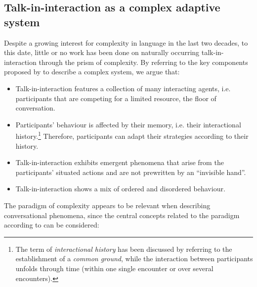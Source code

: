 \documentclass[output=paper]{langscibook}
\begin{document}
\subsection{Talk-in-interaction as a complex adaptive system}

Despite a growing interest for complexity in language in the last two decades, to this date, little or no work has been done on naturally occurring talk-in-in\-ter\-ac\-tion through the prism of complexity. By referring to the key components proposed by \citet{Johnson2007} to describe a complex system, we argue that:

\begin{itemize}
\item Talk-in-interaction features a collection of many interacting agents, i.e. participants that are competing for a limited resource, the floor of conversation.\largerpage

\item Participants' behaviour is affected by their memory, i.e. their interactional history.\footnote{The term of \textit{interactional history} has been discussed by \citet{Deppermann2018} referring to the establishment of a \textit{common ground}, while the interaction between participants unfolds through time (within one single encounter or over several encounters).} Therefore, participants can adapt their strategies according to their history. 

\item Talk-in-interaction exhibits emergent phenomena that arise from the participants' situated actions and are not prewritten by an “invisible hand”.

\item Talk-in-interaction shows a mix of ordered and disordered behaviour.
\end{itemize}

The paradigm of complexity appears to be relevant when describing conversational phenomena, since the central concepts related to the paradigm according to \citet{Edmonds1999} can be considered:
\end{document}
